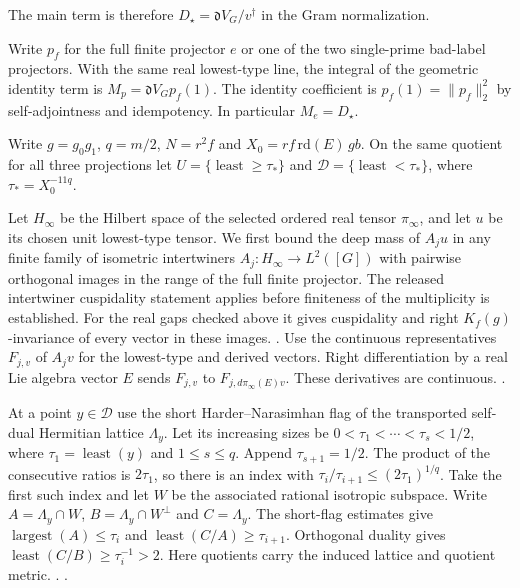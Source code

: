 The main term is therefore \(D_\star=\mathfrak d V_G/v^\dagger\)
in the Gram normalization.

\leavevmode{}%
Write \(p_f\) for the full finite projector \(e\) or one of the two
single-prime bad-label projectors. With the same real lowest-type
line, the integral of the geometric identity term is
\(M_p=\mathfrak d V_G p_f(1)\). The identity coefficient is
\(p_f(1)=\|p_f\|_2^2\) by self-adjointness and idempotency.
In particular \(M_e=D_\star\).

Write \(g=g_0g_1\), \(q=m/2\), \(N=r^2 f\) and
\(X_0=rf\,\mathrm{rd}(E)\,g b\). On the same quotient for all three
projections let \(U=\{\operatorname{least}\ge\tau_*\}\) and
\(\mathscr D=\{\operatorname{least}<\tau_*\}\), where
\(\tau_*=X_0^{-11q}\).

\leavevmode{}%
Let \(H_\infty\) be the Hilbert space of the selected ordered real
tensor \(\pi_\infty\), and let \(u\) be its chosen unit lowest-type
tensor. We first bound the deep mass of \(A_j u\) in any finite family
of isometric intertwiners \(A_j:H_\infty\to L^2([G])\) with pairwise
orthogonal images in the range of the full finite projector. The
released intertwiner cuspidality statement applies before finiteness
of the multiplicity is established. For the real gaps checked above
it gives cuspidality and right \(K_f(g)\)-invariance of every vector
in these images.
.
Use the continuous representatives \(F_{j,v}\) of \(A_jv\) for the
lowest-type and derived vectors. Right differentiation by a real Lie
algebra vector \(E\) sends \(F_{j,v}\) to
\(F_{j,d\pi_\infty(E)v}\). These derivatives are continuous.
.

At a point \(y\in\mathscr D\) use the short Harder--Narasimhan flag of the
transported self-dual Hermitian lattice \(\Lambda_y\). Let its
increasing sizes be \(0<\tau_1<\cdots<\tau_s<1/2\), where
\(\tau_1=\operatorname{least}(y)\) and \(1\le s\le q\). Append
\(\tau_{s+1}=1/2\). The product of the consecutive ratios is
\(2\tau_1\), so there is an index with
\(\tau_i/\tau_{i+1}\le(2\tau_1)^{1/q}\). Take the first such index
and let \(W\) be the associated rational isotropic subspace. Write
\(A=\Lambda_y\cap W\), \(B=\Lambda_y\cap W^\perp\) and
\(C=\Lambda_y\). The short-flag estimates give
\(\operatorname{largest}(A)\le\tau_i\) and
\(\operatorname{least}(C/A)\ge\tau_{i+1}\). Orthogonal duality gives
\(\operatorname{least}(C/B)\ge\tau_i^{-1}>2\). Here quotients carry
the induced lattice and quotient metric.
.
.


